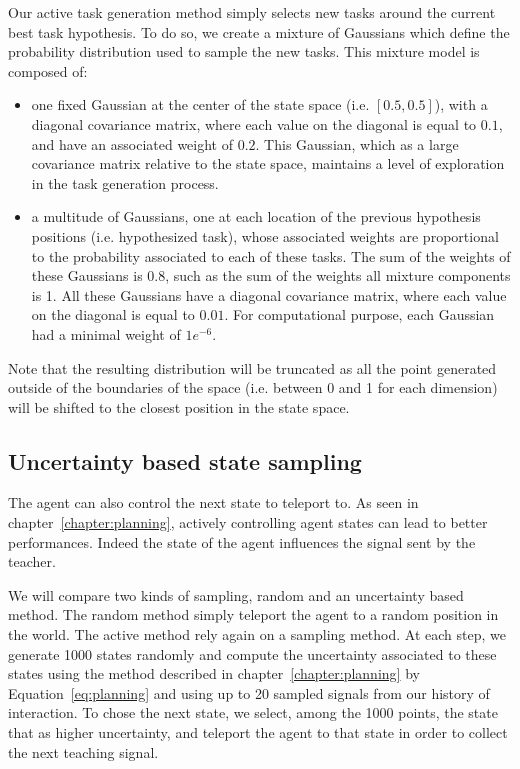 Our active task generation method simply selects new tasks around the current best task hypothesis. To do so, we create a mixture of Gaussians which define the probability distribution used to sample the new tasks. This mixture model is composed of:
\begin{itemize}
\item  one fixed Gaussian at the center of the state space (i.e. $[0.5, 0.5]$), with a diagonal covariance matrix, where each value on the diagonal is equal to $0.1$, and have an associated weight of $0.2$. This Gaussian, which as a large covariance matrix relative to the state space, maintains a level of exploration in the task generation process.
\item a multitude of Gaussians, one at each location of the previous hypothesis positions (i.e. hypothesized task), whose associated weights are proportional to the probability associated to each of these tasks. The sum of the weights of these Gaussians is 0.8, such as the sum of the weights all mixture components is 1. All these Gaussians have a diagonal covariance matrix, where each value on the diagonal is equal to $0.01$. For computational purpose, each Gaussian had a minimal weight of $1e^{-6}$.
\end{itemize}
Note that the resulting distribution will be truncated as all the point generated outside of the boundaries of the space (i.e. between 0 and 1 for each dimension) will be shifted to the closest position in the state space.

\subsection{Uncertainty based state sampling}

The agent can also control the next state to teleport to. As seen in chapter~\ref{chapter:planning}, actively controlling agent states can lead to better performances. Indeed the state of the agent influences the signal sent by the teacher. 

We will compare two kinds of sampling, random and an uncertainty based method. The random method simply teleport the agent to a random position in the world. The active method rely again on a sampling method. At each step, we generate 1000 states randomly and compute the uncertainty associated to these states using the method described in chapter~\ref{chapter:planning} by Equation~\ref{eq:planning} and using up to 20 sampled signals from our history of interaction. To chose the next state, we select, among the 1000 points, the state that as higher uncertainty, and teleport the agent to that state in order to collect the next teaching signal.

